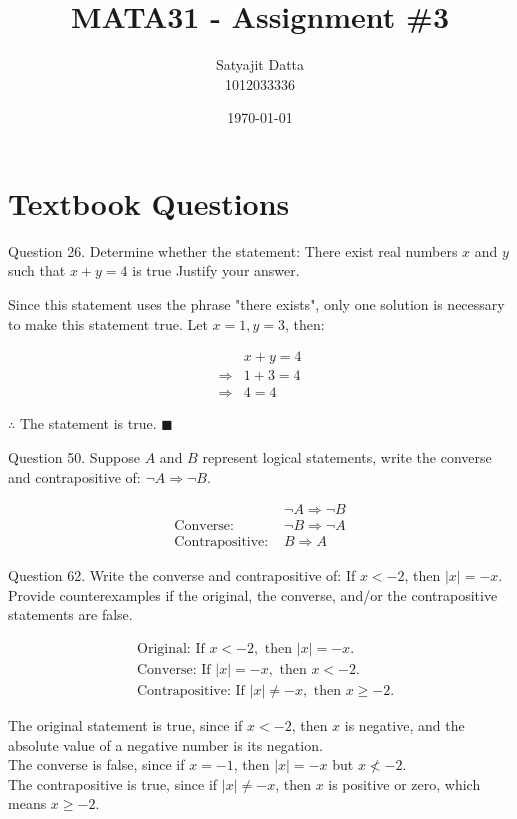 \documentclass[]{article}
\title{\textbf{MATA31 - Assignment \#3}}
\author{ Satyajit Datta \\ 1012033336}
\date{\today}
\begin{document}
\maketitle

\section*{Textbook Questions}
 
\begin{question}{Question 26.}
Determine whether the statement: There exist real numbers $x$ and $y$ such that $x + y = 4$ is true Justify your answer.
\end{question}
\begin{center}
    Since this statement uses the phrase "there exists", only one solution is necessary to make this statement true. Let $x = 1, y=3$, then: 
\end{center}
\begin{align*}
    & x+y = 4\\
    \Rightarrow & 1 + 3 = 4 \\
    \Rightarrow & 4 = 4
\end{align*}
\begin{center}
    $\therefore$ The statement is true. $\blacksquare$
\end{center}

\begin{question}{Question 50.}
Suppose $A$ and $B$ represent logical statements, write the converse and contrapositive of: $\neg A \Rightarrow \neg B$. 
\end{question}
\begin{align*}
    & \neg A \Rightarrow \neg B \\
    \text{Converse: } & \neg B \Rightarrow \neg A \\
    \text{Contrapositive: } & B \Rightarrow A
\end{align*}

\begin{question}{Question 62.}
Write the converse and contrapositive of: If $x < -2$, then $|x| = -x$. Provide counterexamples if the original, the
converse, and/or the contrapositive statements are false.
\end{question}
\begin{align*}
    & \text{Original: If } x < -2, \text{ then } |x| = -x. \\
    & \text{Converse: If } |x| = -x, \text{ then } x < -2. \\
    & \text{Contrapositive: If } |x| \neq -x, \text{ then } x \ge -2.
\end{align*}
\begin{center}
    The original statement is true, since if $x < -2$, then $x$ is negative, and the absolute value of a negative number is its negation. \\
    The converse is false, since if $x = -1$, then $|x| = -x$ but $x \not< -2$. \\
    The contrapositive is true, since if $|x| \neq -x$, then $x$ is positive or zero, which means $x \ge -2$.
\end{center}
\end{document}
